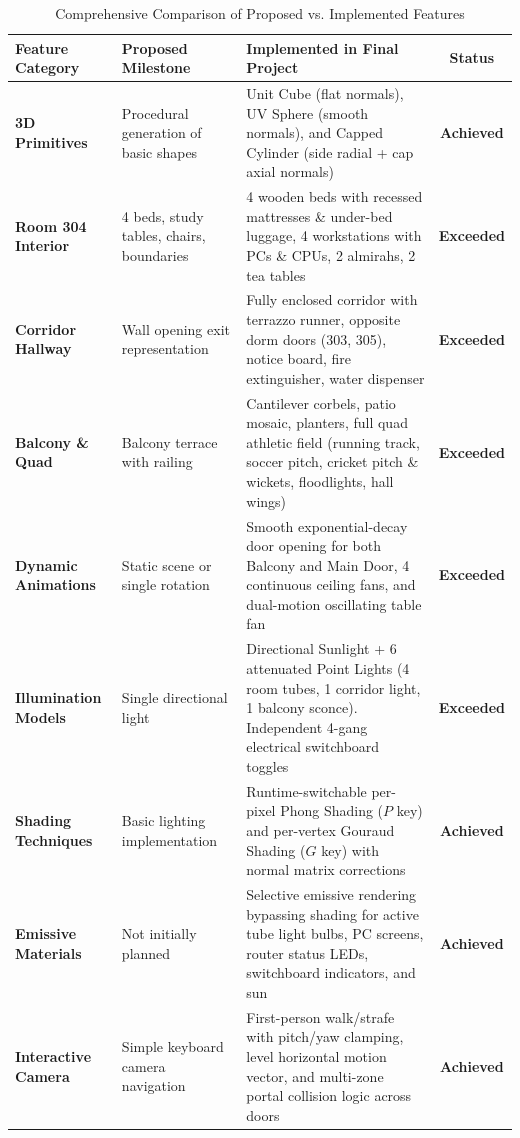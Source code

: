 \documentclass[11pt,a4paper]{article}
\begin{document}
\begin{table}[H]
\centering
\scriptsize
\caption{Comprehensive Comparison of Proposed vs. Implemented Features}
\label{tab:feature_matrix}
\begin{tabularx}{\textwidth}{p{2.5cm}p{3.8cm}p{6.3cm}c}
\toprule
\rowcolor{tableheader}
\textcolor{tableheadertext}{\textbf{Feature Category}} & 
\textcolor{tableheadertext}{\textbf{Proposed Milestone}} & 
\textcolor{tableheadertext}{\textbf{Implemented in Final Project}} & 
\textcolor{tableheadertext}{\textbf{Status}} \\
\midrule
\rowcolor{lightgraybg}
\textbf{3D Primitives} & Procedural generation of basic shapes & Unit Cube (flat normals), UV Sphere (smooth normals), and Capped Cylinder (side radial + cap axial normals) & \textbf{Achieved} \\
\textbf{Room 304 Interior} & 4 beds, study tables, chairs, boundaries & 4 wooden beds with recessed mattresses \& under-bed luggage, 4 workstations with PCs \& CPUs, 2 almirahs, 2 tea tables & \textbf{Exceeded} \\
\rowcolor{lightgraybg}
\textbf{Corridor Hallway} & Wall opening exit representation & Fully enclosed corridor with terrazzo runner, opposite dorm doors (303, 305), notice board, fire extinguisher, water dispenser & \textbf{Exceeded} \\
\textbf{Balcony \& Quad} & Balcony terrace with railing & Cantilever corbels, patio mosaic, planters, full quad athletic field (running track, soccer pitch, cricket pitch \& wickets, floodlights, hall wings) & \textbf{Exceeded} \\
\rowcolor{lightgraybg}
\textbf{Dynamic Animations} & Static scene or single rotation & Smooth exponential-decay door opening for both Balcony and Main Door, 4 continuous ceiling fans, and dual-motion oscillating table fan & \textbf{Exceeded} \\
\textbf{Illumination Models} & Single directional light & Directional Sunlight + 6 attenuated Point Lights (4 room tubes, 1 corridor light, 1 balcony sconce). Independent 4-gang electrical switchboard toggles & \textbf{Exceeded} \\
\rowcolor{lightgraybg}
\textbf{Shading Techniques} & Basic lighting implementation & Runtime-switchable per-pixel Phong Shading ($P$ key) and per-vertex Gouraud Shading ($G$ key) with normal matrix corrections & \textbf{Achieved} \\
\textbf{Emissive Materials} & Not initially planned & Selective emissive rendering bypassing shading for active tube light bulbs, PC screens, router status LEDs, switchboard indicators, and sun & \textbf{Achieved} \\
\rowcolor{lightgraybg}
\textbf{Interactive Camera} & Simple keyboard camera navigation & First-person walk/strafe with pitch/yaw clamping, level horizontal motion vector, and multi-zone portal collision logic across doors & \textbf{Achieved} \\
\bottomrule
\end{tabularx}
\end{table}
\end{document}
